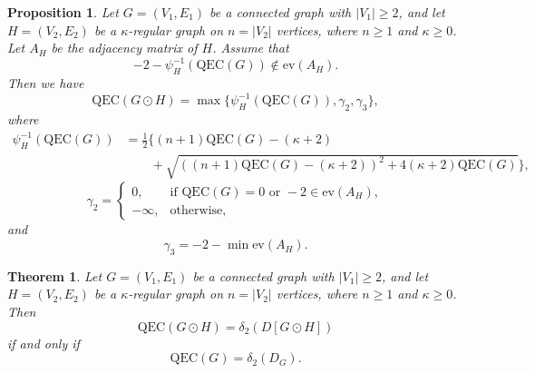 \documentclass[10pt,a4paper]{amsart}
\newtheorem{proposition}{Proposition}
\newtheorem{theorem}{Theorem}
\begin{document}
\begin{proposition}\label{prop:corona graph of G and H}
Let $G=(V_1,E_1)$ be a connected graph with $|V_1|\ge 2$, and let 
$H=(V_2,E_2)$ be a $\kappa$-regular graph on $n=|V_2|$ vertices, where $n\geq 1$ and $\kappa\geq 0$. 
Let $A_H$ be the adjacency matrix of $H$.
Assume that
\begin{equation}\label{eq:condition-spectrum graph of G and H}
-2-\psi_H^{-1}(\mathrm{QEC}(G))
\notin \mathrm{ev}(A_H).
\end{equation}
Then we have
\begin{equation}\label{eq:qec-corona graph of G and H}
\mathrm{QEC}(G\odot H)
=
\max\{
\psi_H^{-1}(\mathrm{QEC}(G)),\gamma_2,\gamma_3
\},
\end{equation}
where
\begin{equation}
\begin{split}\label{eq: psi of G and H}
\psi_H^{-1}(\mathrm{QEC}(G))&=\frac{1}{2}\bigg\{(n+1)\mathrm{QEC}(G)-(\kappa+2)\\
&\qquad+\sqrt{\left((n+1)\mathrm{QEC}(G)-(\kappa+2)\right)^2+4(\kappa+2)\mathrm{QEC}(G)}\bigg\},
\end{split}
\end{equation}
\begin{equation}\label{eq:gamma2-graph of G and H}
\gamma_2=
\begin{cases}
0, & \text{if } \mathrm{QEC}(G)=0 \text{ or } -2\in \mathrm{ev}(A_H),\\
-\infty, & \text{otherwise},
\end{cases}
\end{equation}
and
\begin{equation}\label{eq:gamma3-graph of G and H}
\gamma_3
=
-2-\min \mathrm{ev}(A_H).
\end{equation}
\end{proposition}

\begin{theorem}
Let $G=(V_1,E_1)$ be a connected graph with $|V_1|\ge 2$, and let 
$H=(V_2,E_2)$ be a $\kappa$-regular graph on $n=|V_2|$ vertices, where $n\geq 1$ and $\kappa\geq 0$. Then
\[
\mathrm{QEC}(G\odot H)=\delta_2(D[G\odot H])
\]
if and only if
\[
\mathrm{QEC}(G)=\delta_2(D_G).
\]
\end{theorem}
\end{document}
